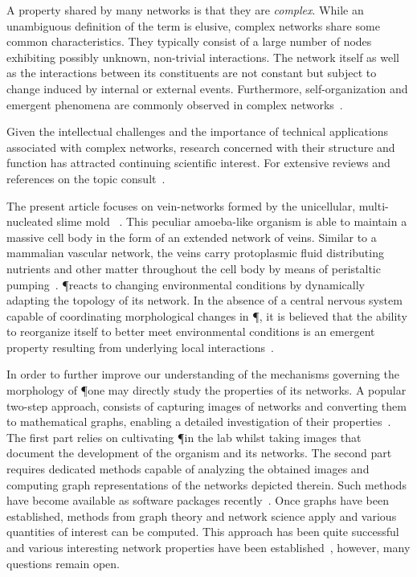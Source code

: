	A property shared by many networks is that they are \emph{complex}. While an unambiguous definition of the term is elusive, complex networks share some common characteristics. They typically consist of a large number of nodes exhibiting possibly unknown, non-trivial interactions. The network itself as well as the interactions between its constituents are not constant but subject to change induced by internal or external events. Furthermore, self-organization and emergent phenomena are commonly observed in complex networks~\cite{barabasi1999emergence,boccaletti2006complex}.

	Given the intellectual challenges and the importance of technical applications associated with complex networks, research concerned with their structure and function has attracted continuing scientific interest. For extensive reviews and references on the topic consult~\cite{newman2003structure,boccaletti2006complex,strogatz2001exploring,amaral2004complex}.

	The present article focuses on vein-networks formed by the unicellular, multi-nucleated slime mold \Pp~\cite{lifecycle}. This peculiar amoeba-like organism is able to maintain a massive cell body in the form of an extended network of veins. Similar to a mammalian vascular network, the veins carry protoplasmic fluid distributing nutrients and other matter throughout the cell body by means of peristaltic pumping~\cite{kamiya1959motive}. \P reacts to changing environmental conditions by dynamically adapting the topology of its network. In the absence of a central nervous system capable of coordinating morphological changes in \P, it is believed that the ability to reorganize itself to better meet environmental conditions is an emergent property resulting from underlying local interactions~\cite{tero2010rules,nakagaki2007minimum}.

	In order to further improve our understanding of the mechanisms governing the morphology of \P one may directly study the properties of its networks. A popular two-step approach, consists of capturing images of networks and converting them to mathematical graphs, enabling a detailed investigation of their properties~\cite{baumgarten2012computational}. The first part relies on cultivating \P in the lab whilst taking images that document the development of the organism and its networks. The second part requires dedicated methods capable of analyzing the obtained images and computing graph representations of the networks depicted therein. Such methods have become available as software packages recently~\cite{dirnberger2015nefi}. Once graphs have been established, methods from graph theory and network science apply and various quantities of interest can be computed. This approach has been quite successful and various interesting network properties have been established~\cite{baumgarten2010plasmodial,baumgarten2013functional,ito2011characterization}, however, many questions remain open.

